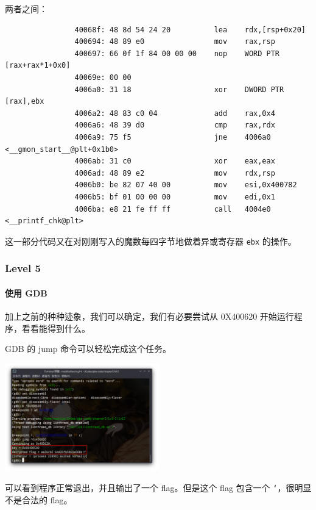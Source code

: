 \documentclass{ctexbeamer}
\begin{document}
    \begin{frame}[fragile]

        两者之间：
    
        {
            \scriptsize
            \begin{verbatim}
                40068f:	48 8d 54 24 20       	lea    rdx,[rsp+0x20]
                400694:	48 89 e0             	mov    rax,rsp
                400697:	66 0f 1f 84 00 00 00 	nop    WORD PTR [rax+rax*1+0x0]
                40069e:	00 00 
                4006a0:	31 18                	xor    DWORD PTR [rax],ebx
                4006a2:	48 83 c0 04          	add    rax,0x4
                4006a6:	48 39 d0             	cmp    rax,rdx
                4006a9:	75 f5                	jne    4006a0 <__gmon_start__@plt+0x1b0>
                4006ab:	31 c0                	xor    eax,eax
                4006ad:	48 89 e2             	mov    rdx,rsp
                4006b0:	be 82 07 40 00       	mov    esi,0x400782
                4006b5:	bf 01 00 00 00       	mov    edi,0x1
                4006ba:	e8 21 fe ff ff       	call   4004e0 <__printf_chk@plt>
            \end{verbatim}
        }

        \pause 这一部分代码又在对刚刚写入的魔数每四字节地做着异或寄存器 \texttt{ebx} 的操作。
    
    \end{frame}

    \begin{frame}[fragile]
        \frametitle{Level 5}
        \framesubtitle{使用 GDB}
    
        加上之前的种种迹象，我们可以确定，我们有必要尝试从 0X400620 开始运行程序，看看能得到什么。

        GDB 的 jump 命令可以轻松完成这个任务。\pause

        \begin{center}
            \includegraphics[width=0.5\textwidth]{pics/lvl5-gdb-1.png}
        \end{center}

        可以看到程序正常退出，并且输出了一个 flag。但是这个 flag 包含一个 \texttt{`}，很明显不是合法的 flag。
    
    \end{frame}
\end{document}

